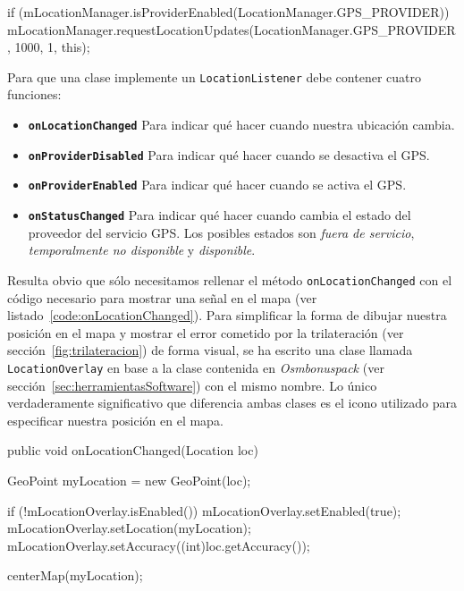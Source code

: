 \begin{listing}[
  float=ht,
  language = java,
  caption  = {Ejemplo de uso de \texttt{LocationManager} utilizando la propia clase como
                 \texttt{LocationListener} y 1 segundo de intervalo entre actualizaciones},
  label    = code:locationManager]
if (mLocationManager.isProviderEnabled(LocationManager.GPS_PROVIDER)){
    mLocationManager.requestLocationUpdates(LocationManager.GPS_PROVIDER, 1000, 1, this);
}
\end{listing}

\newpage
Para que una clase implemente un \texttt{LocationListener} debe contener cuatro funciones:

\begin{itemize}
  \item \textbf{\texttt{onLocationChanged}} Para indicar qué hacer cuando nuestra ubicación cambia.
  \item \textbf{\texttt{onProviderDisabled}} Para indicar qué hacer cuando se desactiva el
    \acs{GPS}.
  \item \textbf{\texttt{onProviderEnabled}} Para indicar qué hacer cuando se activa el \acs{GPS}.
  \item \textbf{\texttt{onStatusChanged}} Para indicar qué hacer cuando cambia el estado del
    proveedor del servicio \acs{GPS}. Los posibles estados son \emph{fuera de servicio},
    \emph{temporalmente no disponible} y \emph{disponible}.
\end{itemize}

Resulta obvio que sólo necesitamos rellenar el método \texttt{onLocationChanged} con el código
necesario para mostrar una señal en el mapa (ver listado~\ref{code:onLocationChanged}). Para
simplificar la forma de dibujar nuestra posición en el mapa y mostrar el error cometido por la
trilateración (ver sección~\ref{fig:trilateracion}) de forma visual, se ha escrito una clase llamada
\texttt{LocationOverlay} en base a la clase contenida en \emph{Osmbonuspack} (ver
sección~\ref{sec:herramientasSoftware}) con el mismo nombre. Lo único verdaderamente significativo
que diferencia ambas clases es el icono utilizado para especificar nuestra posición en el mapa.

\begin{listing}[
  float=ht,
  language = java,
  caption  = {Ejemplo de implementación de \texttt{LocationListener} utilizando para mostrar la
                localización un \texttt{LocationOverlay}},
  label    = code:onLocationChanged]
public void onLocationChanged(Location loc) {
    GeoPoint myLocation = new GeoPoint(loc); 	
    
    if (!mLocationOverlay.isEnabled()) {
        mLocationOverlay.setEnabled(true);
    }
    mLocationOverlay.setLocation(myLocation);
    mLocationOverlay.setAccuracy((int)loc.getAccuracy());

    centerMap(myLocation);
}
\end{listing}

